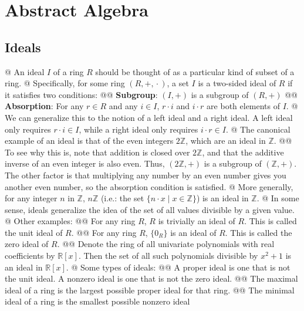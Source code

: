 \documentclass[]{article}
\newcommand{\mbb}[1]{\ensuremath{\mathbb{#1}}}     %
\begin{document}
\section{Abstract Algebra}

\subsection{Ideals}

\begin{easylist}[enumerate]
@ {%
  An \textsf{ideal} $I$ of a ring $R$ should be thought of as a particular kind
  of subset of a ring.
}
@ {%
  Specifically, for some ring $(R, +, {}\cdot{})$, a set $I$ is a
  \textsf{two-sided ideal} of $R$ if it satisfies two conditions:
}
@@ \textbf{Subgroup}: $(I, +)$ is a subgroup of $(R, +)$
@@ {%
  \textbf{Absorption}: For any $r \in R$ and any $i \in I$, $r \cdot i$ and
  $i \cdot r$ are both elements of $I$.
}
@ {%
  We can generalize this to the notion of a \textsf{left ideal} and a
  \textsf{right ideal}. A left ideal only requires $r \cdot i \in I$, while a
  right ideal only requires $i \cdot r \in I$.
}
@ {%
  The canonical example of an ideal is that of the even integers $2\mbb{Z}$,
  which are an ideal in $\mbb{Z}$.
}
@@ {%
  To see why this is, note that addition is closed over $2\mbb{Z}$, and that
  the additive inverse of an even integer is also even. Thus, $(2\mbb{Z}, +)$
  is a subgroup of $(\mbb{Z}, +)$. The other factor is that multiplying any
  number by an even number gives you another even number, so the absorption
  condition is satisfied.
}
@ {%
  More generally, for any integer $n$ in $\mbb{Z}$, $n\mbb{Z}$ (i.e.: the set
  $\{n \cdot x \mid x \in \mbb{Z}\}$) is an ideal in $\mbb{Z}$.
}
@ {%
  In some sense, ideals generalize the idea of the set of all values
  divisible by a given value.
}
@ Other examples:
@@ {%
  For any ring $R$, $R$ is trivially an ideal of $R$.
  This is called the \textsf{unit ideal} of $R$.
}
@@ {%
  For any ring $R$, $\{0_R\}$ is an ideal of $R$.
  This is called the \textsf{zero ideal} of $R$.
}
@@ {%
  Denote the ring of all univariate polynomials with real coefficients
  by $\mbb{R}[x]$. Then the set of all such polynomials divisible by $x^2 + 1$
  is an ideal in $\mbb{R}[x]$.
}
@ Some types of ideals:
@@ {%
  A \textsf{proper ideal}  is one that is not the unit ideal.
  A \textsf{nonzero ideal} is one that is not the zero ideal.
}
@@ {%
  The \textsf{maximal ideal} of a ring is the largest possible proper ideal
  for that ring.
}
@@ {%
  The \textsf{minimal ideal} of a ring is the smallest possible nonzero ideal
}
\end{easylist}
\end{document}
